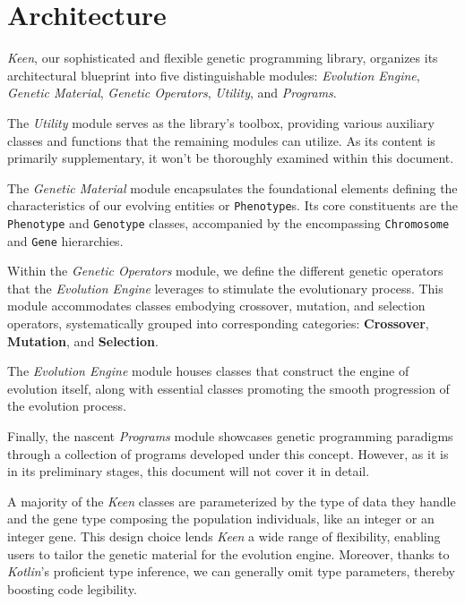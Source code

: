 \section{Architecture}
\label{sec:architecture}
    \textit{Keen}, our sophisticated and flexible genetic programming library, organizes its architectural blueprint into five distinguishable modules: \textit{Evolution Engine}, \textit{Genetic Material}, \textit{Genetic Operators}, \textit{Utility}, and \textit{Programs}.


    The \textit{Utility} module serves as the library's toolbox, providing various auxiliary classes and functions that the remaining modules can utilize.
    As its content is primarily supplementary, it won't be thoroughly examined within this document.

    The \textit{Genetic Material} module encapsulates the foundational elements defining the characteristics of our evolving entities or \texttt{Phenotype}s.
    Its core constituents are the \texttt{Phenotype} and \texttt{Genotype} classes, accompanied by the encompassing \texttt{Chromosome} and \texttt{Gene} hierarchies.

    Within the \textit{Genetic Operators} module, we define the different genetic operators that the \textit{Evolution Engine} leverages to stimulate the evolutionary process.
    This module accommodates classes embodying crossover, mutation, and selection operators, systematically grouped into corresponding categories: \textbf{Crossover}, \textbf{Mutation}, and \textbf{Selection}.

    The \textit{Evolution Engine} module houses classes that construct the engine of evolution itself, along with essential classes promoting the smooth progression of the evolution process.

    Finally, the nascent \textit{Programs} module showcases genetic programming paradigms through a collection of programs developed under this concept.
    However, as it is in its preliminary stages, this document will not cover it in detail.

    A majority of the \textit{Keen} classes are parameterized by the type of data they handle and the gene type composing the population individuals, like an integer or an integer gene.
    This design choice lends \textit{Keen} a wide range of flexibility, enabling users to tailor the genetic material for the evolution engine.
    Moreover, thanks to \textit{Kotlin}'s proficient type inference, we can generally omit type parameters, thereby boosting code legibility.

